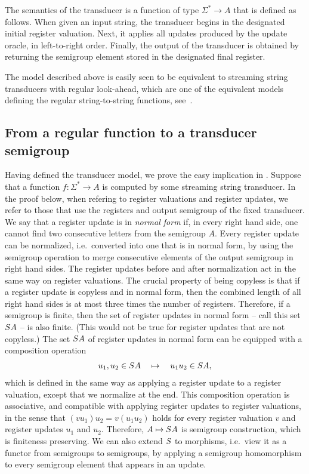The semantics of the transducer is a function of type $\Sigma^* \to A$ that is defined as follows. When given an input string, the transducer begins in the designated initial register valuation. Next, it applies all updates produced by the update oracle, in left-to-right order. Finally, the output of the transducer is obtained by returning the semigroup element stored in the designated final register. 

The model described above is easily seen to be equivalent to streaming string transducers with regular look-ahead, which are one of the equivalent models defining the regular string-to-string functions, see~\cite[Section 12]{bojanczyk_automata_2018}. 

\subsection{From a regular function to a transducer semigroup}
\label{sec:easy}

Having defined the transducer model, we prove the easy implication  in  . Suppose that a function $f : \Sigma^* \to A$ is computed by some streaming string transducer. In the proof below, when refering to register valuations and register updates, we refer to those that use the registers and output semigroup of the fixed transducer. We say that a register update is in \emph{normal form} if, in every right hand side, one cannot find two consecutive letters from the semigroup $A$. Every register update can be normalized, i.e.~converted into one that is in normal form, by using the semigroup operation to merge consecutive elements of the output semigroup in right hand sides. The  register updates before and after normalization act in the same way on register valuations.   The crucial property of being copyless is that if a register update is copyless and in normal form, then the combined length of all right hand sides is at most three times the number of registers. Therefore, if a semigroup is finite, then the set of register updates in normal form -- call this set $\functors A$ --  is also finite. (This would not be true for register updates that are not copyless.) The set $\functors A$ of register updates in normal form can be equipped with a composition operation 
\begin{align*}
    u_1,u_2 \in \functors A  \quad \mapsto \quad u_1u_2 \in \functors A,
    \end{align*}
which is defined in the same way as applying a register update to a register valuation, except that we normalize at the end. This composition operation is associative, and  compatible with applying register updates to register valuations, in the sense that $(vu_1)u_2 = v(u_1u_2)$ holds for every register valuation $v$ and register updates $u_1$ and $u_2$. Therefore, $A \mapsto \functors A$ is semigroup construction, which is finiteness preserving. We can also extend $\functors$ to morphisms, i.e.~view it as a functor from semigroups to semigroups, by applying a semigroup homomorphism to every semigroup element that appears in an update.

